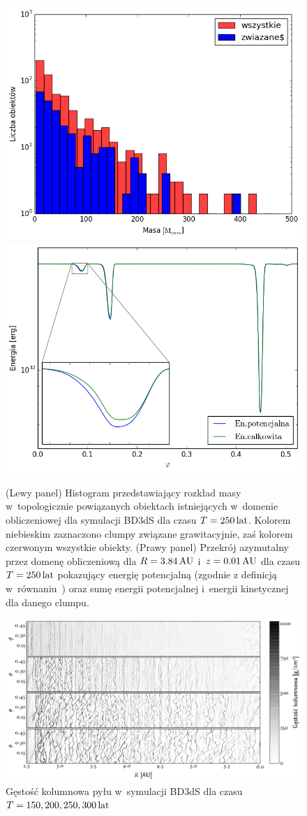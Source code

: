 \begin{figure}
   \centering
   \includegraphics[width=0.49\linewidth]{figures/masshist.png}
   \includegraphics[width=0.49\linewidth]{figures/energie.png}
   \caption{(Lewy panel) Histogram przedstawiający rozkład masy w~topologicznie powiązanych
   obiektach istniejących w~domenie obliczeniowej dla symulacji BD3dS dla czasu
   $T=250\hbox{$\thinspace\textrm{lat}$}$. Kolorem niebieskim zaznaczono clumpy związane grawitacyjnie, zaś
   kolorem czerwonym wszystkie obiekty.
   (Prawy panel) Przekrój azymutalny przez domenę obliczeniową dla $R=3.84\hbox{$\thinspace\textrm{AU}$}$
   i~$z=0.01\hbox{$\thinspace\textrm{AU}$}$ dla czasu $T=250\hbox{$\thinspace\textrm{lat}$}$ pokazujący energię potencjalną (zgodnie z
   definicją w~równaniu~) oraz sumę energii potencjalnej i~energii
   kinetycznej dla danego clumpu.}
   \label{fig:masshist}
\end{figure}
%
\begin{figure}
   \centering
   \includegraphics[width=0.95\linewidth]{figures/proj_sg}
   \caption{Gęstość kolumnowa pyłu w~symulacji BD3dS dla czasu $T=150, 200, 250, 300\hbox{$\thinspace\textrm{lat}$}$}
   \label{fig:projs}
\end{figure}
